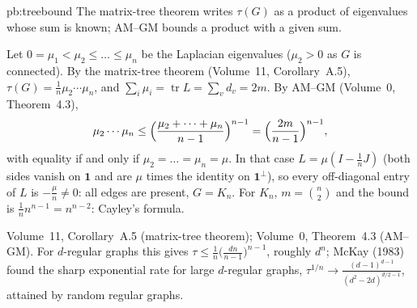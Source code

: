 \begin{solution}{pb:treebound}
\idea The matrix-tree theorem writes $\tau(G)$ as a product of eigenvalues whose sum is known; AM--GM bounds a product with a given
sum.

\writeup Let $0=\mu_1<\mu_2\le\dots\le\mu_n$ be the Laplacian eigenvalues ($\mu_2>0$ as $G$ is connected). By the matrix-tree theorem
(Volume~11, Corollary~A.5), $\tau(G)=\frac1n\mu_2\cdots\mu_n$, and $\sum_i\mu_i=\operatorname{tr}L=\sum_vd_v=2m$. By AM--GM (Volume~0,
Theorem~4.3),
\[
\mu_2\cdots\mu_n\le\Bigl(\frac{\mu_2+\dots+\mu_n}{n-1}\Bigr)^{n-1}=\Bigl(\frac{2m}{n-1}\Bigr)^{n-1},
\]
with equality if and only if $\mu_2=\dots=\mu_n=\mu$. In that case $L=\mu(I-\frac1nJ)$ (both sides vanish on $\mathbf1$ and are $\mu$ times the
identity on $\mathbf1^\perp$), so every off-diagonal entry of $L$ is $-\frac\mu n\ne0$: all edges are present, $G=K_n$. For $K_n$,
$m=\binom n2$ and the bound is $\frac1nn^{n-1}=n^{n-2}$: Cayley's formula.

\tools Volume~11, Corollary~A.5 (matrix-tree theorem); Volume~0, Theorem~4.3 (AM--GM).
\leads For $d$-regular graphs this gives $\tau\le\frac1n\bigl(\frac{dn}{n-1}\bigr)^{n-1}$, roughly $d^n$; McKay (1983) found the sharp exponential rate
for large $d$-regular graphs, $\tau^{1/n}\to\frac{(d-1)^{d-1}}{(d^2-2d)^{d/2-1}}$, attained by random regular graphs.
\end{solution}


